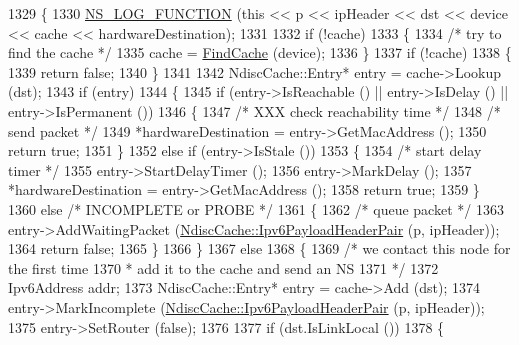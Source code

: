\begin{DoxyCode}
1329 \{
1330   \hyperlink{log-macros-disabled_8h_a90b90d5bad1f39cb1b64923ea94c0761}{NS\_LOG\_FUNCTION} (\textcolor{keyword}{this} << p << ipHeader << dst << device << cache << hardwareDestination);
1331 
1332   \textcolor{keywordflow}{if} (!cache)
1333     \{
1334       \textcolor{comment}{/* try to find the cache */}
1335       cache = \hyperlink{classns3_1_1Icmpv6L4Protocol_a90167126423f3957718e22a8bcd325c8}{FindCache} (device);
1336     \}
1337   \textcolor{keywordflow}{if} (!cache)
1338     \{
1339       \textcolor{keywordflow}{return} \textcolor{keyword}{false};
1340     \}
1341 
1342   NdiscCache::Entry* entry = cache->Lookup (dst);
1343   \textcolor{keywordflow}{if} (entry)
1344     \{
1345       \textcolor{keywordflow}{if} (entry->IsReachable () || entry->IsDelay () || entry->IsPermanent ())
1346         \{
1347           \textcolor{comment}{/* XXX check reachability time */}
1348           \textcolor{comment}{/* send packet */}
1349           *hardwareDestination = entry->GetMacAddress ();
1350           \textcolor{keywordflow}{return} \textcolor{keyword}{true};
1351         \}
1352       \textcolor{keywordflow}{else} \textcolor{keywordflow}{if} (entry->IsStale ())
1353         \{
1354           \textcolor{comment}{/* start delay timer */}
1355           entry->StartDelayTimer ();
1356           entry->MarkDelay ();
1357           *hardwareDestination = entry->GetMacAddress ();
1358           \textcolor{keywordflow}{return} \textcolor{keyword}{true};
1359         \}
1360       \textcolor{keywordflow}{else} \textcolor{comment}{/* INCOMPLETE or PROBE */}
1361         \{
1362           \textcolor{comment}{/* queue packet */}
1363           entry->AddWaitingPacket (\hyperlink{classns3_1_1NdiscCache_a29c07f4c9da0e923f442f6440666240e}{NdiscCache::Ipv6PayloadHeaderPair} (p, 
      ipHeader));
1364           \textcolor{keywordflow}{return} \textcolor{keyword}{false};
1365         \}
1366     \}
1367   \textcolor{keywordflow}{else}
1368     \{
1369       \textcolor{comment}{/* we contact this node for the first time}
1370 \textcolor{comment}{       * add it to the cache and send an NS}
1371 \textcolor{comment}{       */}
1372       Ipv6Address addr;
1373       NdiscCache::Entry* entry = cache->Add (dst);
1374       entry->MarkIncomplete (\hyperlink{classns3_1_1NdiscCache_a29c07f4c9da0e923f442f6440666240e}{NdiscCache::Ipv6PayloadHeaderPair} (p, 
      ipHeader));
1375       entry->SetRouter (\textcolor{keyword}{false});
1376 
1377       \textcolor{keywordflow}{if} (dst.IsLinkLocal ())
1378         \{

\end{DoxyCode}
